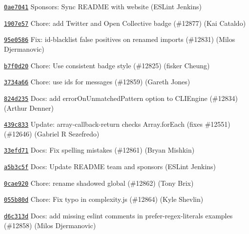 \begin{DoxyItemize}
\item \href{https://github.com/eslint/eslint/commit/0ae70417af70ad565450d9e779ae78c05f6a51e2}{\texttt{ {\ttfamily 0ae7041}}} Sponsors\+: Sync README with website (ESLint Jenkins)
\item \href{https://github.com/eslint/eslint/commit/1907e57362f7d5f7a02a5a78f24ac3347f868e93}{\texttt{ {\ttfamily 1907e57}}} Chore\+: add Twitter and Open Collective badge (\#12877) (Kai Cataldo)
\item \href{https://github.com/eslint/eslint/commit/95e0586c95e6953d11983d1d11891ed30318109a}{\texttt{ {\ttfamily 95e0586}}} Fix\+: id-\/blacklist false positives on renamed imports (\#12831) (Milos Djermanovic)
\item \href{https://github.com/eslint/eslint/commit/b7f0d200c125b3d233ccafaabdaa61c66dc60e3c}{\texttt{ {\ttfamily b7f0d20}}} Chore\+: Use consistent badge style (\#12825) (fisker Cheung)
\item \href{https://github.com/eslint/eslint/commit/3734a669983de7d5107ba8f39b291c6e3116489f}{\texttt{ {\ttfamily 3734a66}}} Chore\+: use ids for messages (\#12859) (Gareth Jones)
\item \href{https://github.com/eslint/eslint/commit/824d23585c205f2993716585cb6f55dfbe4a33f0}{\texttt{ {\ttfamily 824d235}}} Docs\+: add error\+On\+Unmatched\+Pattern option to CLIEngine (\#12834) (Arthur Denner)
\item \href{https://github.com/eslint/eslint/commit/439c83342c364ba3ce5168d54e165b1fe3e35630}{\texttt{ {\ttfamily 439c833}}} Update\+: array-\/callback-\/return checks Array.\+for\+Each (fixes \#12551) (\#12646) (Gabriel R Sezefredo)
\item \href{https://github.com/eslint/eslint/commit/33efd71d7c3496b4b9cbfe006280527064940826}{\texttt{ {\ttfamily 33efd71}}} Docs\+: Fix spelling mistakes (\#12861) (Bryan Mishkin)
\item \href{https://github.com/eslint/eslint/commit/a5b3c5fa4edc2312534af0d9f0911f68144f8baf}{\texttt{ {\ttfamily a5b3c5f}}} Docs\+: Update README team and sponsors (ESLint Jenkins)
\item \href{https://github.com/eslint/eslint/commit/0cae9203a8077184ad6beb00028fd376cc806f34}{\texttt{ {\ttfamily 0cae920}}} Chore\+: rename shadowed global (\#12862) (Tony Brix)
\item \href{https://github.com/eslint/eslint/commit/055b80dc89bba2a5ab22f7a27deb40135b5cacfa}{\texttt{ {\ttfamily 055b80d}}} Chore\+: Fix typo in complexity.\+js (\#12864) (Kyle Shevlin)
\item \href{https://github.com/eslint/eslint/commit/d6c313de794ea0671d35b5027288cd2ea456c0b5}{\texttt{ {\ttfamily d6c313d}}} Docs\+: add missing eslint comments in prefer-\/regex-\/literals examples (\#12858) (Milos Djermanovic)

\end{DoxyItemize}
